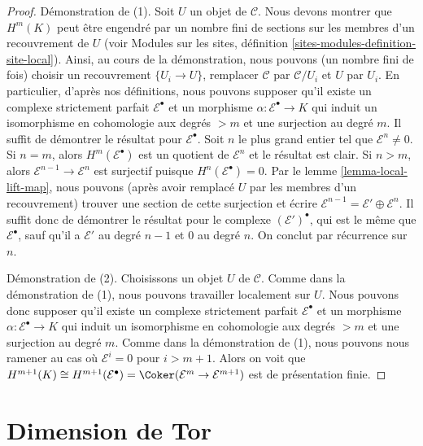 \begin{proof}
Démonstration de (1). Soit $U$ un objet de $\mathcal{C}$. Nous devons montrer
que $H^m(K)$ peut être engendré par un nombre fini de sections sur les membres
d'un recouvrement de $U$ (voir Modules sur les sites, définition
\ref{sites-modules-definition-site-local}). Ainsi, au cours de la
démonstration, nous pouvons (un nombre fini de fois) choisir un recouvrement
$\{U_i \to U\}$, remplacer $\mathcal{C}$ par $\mathcal{C}/U_i$ et $U$ par
$U_i$. En particulier, d'après nos définitions, nous pouvons supposer qu'il
existe un complexe strictement parfait $\mathcal{E}^\bullet$ et un morphisme
$\alpha : \mathcal{E}^\bullet \to K$ qui induit un isomorphisme en cohomologie
aux degrés $> m$ et une surjection au degré $m$. Il suffit de démontrer le
résultat pour $\mathcal{E}^\bullet$. Soit $n$ le plus grand entier tel que
$\mathcal{E}^n \not = 0$. Si $n = m$, alors
$H^m(\mathcal{E}^\bullet)$ est un quotient de $\mathcal{E}^n$ et le résultat
est clair. Si $n > m$, alors $\mathcal{E}^{n - 1} \to \mathcal{E}^n$ est
surjectif puisque $H^n(\mathcal{E}^\bullet) = 0$. Par le lemme
\ref{lemma-local-lift-map}, nous pouvons (après avoir remplacé $U$ par les
membres d'un recouvrement) trouver une section de cette surjection et écrire
$\mathcal{E}^{n - 1} = \mathcal{E}' \oplus \mathcal{E}^n$. Il suffit donc de
démontrer le résultat pour le complexe $(\mathcal{E}')^\bullet$, qui est le
même que $\mathcal{E}^\bullet$, sauf qu'il a $\mathcal{E}'$ au degré $n - 1$
et $0$ au degré $n$. On conclut par récurrence sur $n$.

\medskip\noindent
Démonstration de (2). Choisissons un objet $U$ de $\mathcal{C}$. Comme dans
la démonstration de (1), nous pouvons travailler localement sur $U$. Nous
pouvons donc supposer qu'il existe un complexe strictement parfait
$\mathcal{E}^\bullet$ et un morphisme
$\alpha : \mathcal{E}^\bullet \to K$ qui induit un isomorphisme en cohomologie
aux degrés $> m$ et une surjection au degré $m$. Comme dans la démonstration
de (1), nous pouvons nous ramener au cas où $\mathcal{E}^i = 0$ pour
$i > m + 1$. Alors on voit que
$H^{m + 1}(K) \cong H^{m + 1}(\mathcal{E}^\bullet) =
\Coker(\mathcal{E}^m \to \mathcal{E}^{m + 1})$
est de présentation finie.
\end{proof}








\section{Dimension de Tor}
\label{section-tor}

